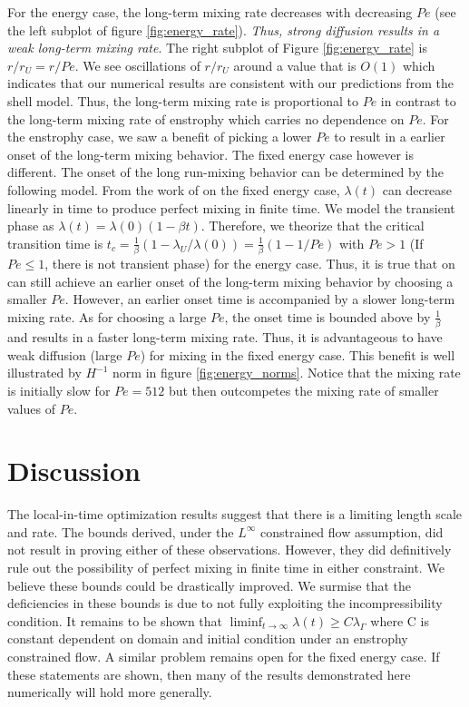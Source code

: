 \documentclass[12pt]{iopart}
\begin{document}
For the energy case, the long-term mixing rate decreases with decreasing $Pe$ (see the left subplot of figure \ref{fig:energy_rate}).  {\it Thus, strong diffusion results in a weak long-term mixing rate}. The right subplot of Figure \ref{fig:energy_rate} is $r/r_{U} =  r/Pe$. We see oscillations of $r/r_{U}$ around a value that is $O(1)$ which indicates that our numerical results are consistent with our predictions from the shell model. Thus, the long-term mixing rate is proportional to $Pe$ in contrast to the long-term mixing rate of enstrophy which carries no dependence on $Pe$. For the enstrophy case, we saw a benefit of picking a lower $Pe$ to result in a earlier onset of the long-term mixing behavior. The fixed energy case however is different. The onset of the long run-mixing behavior can be determined by the following model. From the work of \cite{JMP2012} on the fixed energy case, $\lambda(t)$ can decrease linearly in time to produce perfect mixing in finite time. We model the transient phase as $\lambda(t)=\lambda(0)(1-\beta t)$. Therefore, we theorize that the critical transition time is $t_{c}=\frac{1}{\beta}(1 -\lambda_{U}/\lambda(0)) = \frac{1}{\beta}(1 - 1/Pe)$ with $Pe> 1$ (If $Pe \leq 1$, there is not transient phase) for the energy case. Thus, it is true that on can still achieve an earlier onset of the long-term mixing behavior by choosing a smaller $Pe$. However, an earlier onset time is accompanied by a slower long-term mixing rate. As for choosing a large $Pe$, the onset time is bounded above by $\frac{1}{\beta}$ and results in a faster long-term mixing rate. Thus, it is advantageous to have weak diffusion (large $Pe$) for mixing in the fixed energy case. This benefit is well illustrated by $H^{-1}$ norm in figure \ref{fig:energy_norms}. Notice that the mixing rate is initially slow for $Pe = 512$ but then outcompetes the mixing rate of smaller values of $Pe$. 




\section{Discussion}
\label{sec:discussion}
The local-in-time optimization results suggest that there is a limiting length scale and rate. The bounds derived, under the $L^{\infty}$ constrained flow assumption, did not result in proving either of these observations. However, they did definitively rule out the possibility of perfect mixing in finite time in either constraint. We believe these bounds could be drastically improved. We surmise that the deficiencies in these bounds is due to not fully exploiting the incompressibility condition. It remains to be shown that $\liminf_{t\rightarrow \infty} \lambda (t)\geq C\lambda_{\Gamma}$ where C is constant dependent on domain and initial condition under an enstrophy constrained flow. A similar problem remains open for the fixed energy case.  If these statements are shown, then many of the results demonstrated here numerically will hold more generally. 
\end{document}
